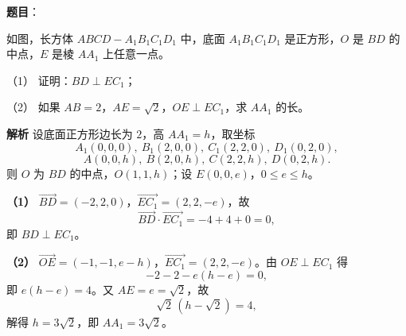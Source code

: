 \begin{answer}

\textbf{题目}：

如图，长方体 $ABCD-A_1B_1C_1D_1$ 中，底面 $A_1B_1C_1D_1$ 是正方形，$O$ 是 $BD$ 的中点，$E$ 是棱 $AA_1$ 上任意一点。

（1） 证明：$BD\perp EC_1$；

（2） 如果 $AB=2$，$AE=\sqrt2$，$OE\perp EC_1$，求 $AA_1$ 的长。
\nopagebreak[4]
\begin{center}\end{center}
\nopagebreak[4]
\textbf{解析}
设底面正方形边长为 $2$，高 $AA_1=h$，取坐标
\nopagebreak[4]
\[A_1(0,0,0),\ B_1(2,0,0),\ C_1(2,2,0),\ D_1(0,2,0),\]
\nopagebreak[4]
\[A(0,0,h),\ B(2,0,h),\ C(2,2,h),\ D(0,2,h).\]
则 $O$ 为 $BD$ 的中点，$O(1,1,h)$；设 $E(0,0,e)$，$0\leqslant e\leqslant h$。

\textbf{（1）} $\overrightarrow{BD}=(-2,2,0)$，$\overrightarrow{EC_1}=(2,2,-e)$，故
\nopagebreak[4]
\[\overrightarrow{BD}\cdot\overrightarrow{EC_1}=-4+4+0=0,\]
即 $BD\perp EC_1$。

\textbf{（2）} $\overrightarrow{OE}=(-1,-1,e-h)$，$\overrightarrow{EC_1}=(2,2,-e)$。由 $OE\perp EC_1$ 得
\nopagebreak[4]
\[-2-2-e(h-e)=0,\]
即 $e(h-e)=4$。又 $AE=e=\sqrt2$，故
\nopagebreak[4]
\[\sqrt2\,(h-\sqrt2)=4,\]
解得 $h=3\sqrt2$，即 $AA_1=3\sqrt2$。



\end{answer}
